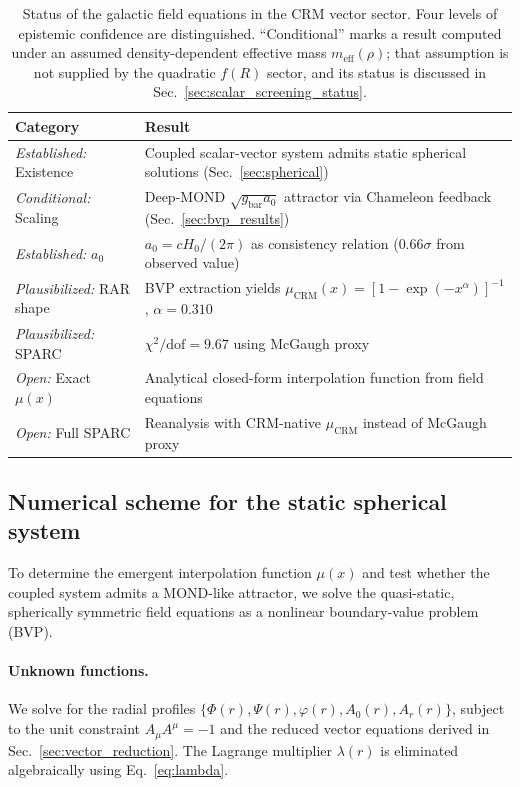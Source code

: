 \documentclass[aps,prd,twocolumn,superscriptaddress,nofootinbib]{revtex4-2}
\begin{document}
\begin{table}[tbp]
\caption{\label{tab:galactic_status}Status of the galactic field equations in the CRM vector sector. Four levels of epistemic confidence are distinguished. ``Conditional'' marks a result computed under an assumed density-dependent effective mass $m_{\mathrm{eff}}(\rho)$; that assumption is not supplied by the quadratic $f(R)$ sector, and its status is discussed in Sec.~\ref{sec:scalar_screening_status}.}
\begin{ruledtabular}
\begin{tabular}{ll}
\textbf{Category} & \textbf{Result} \\
\hline
\textit{Established:} Existence & Coupled scalar-vector system admits static spherical solutions (Sec.~\ref{sec:spherical}) \\
\textit{Conditional:} Scaling & Deep-MOND $\sqrt{g_{\mathrm{bar}} a_0}$ attractor via Chameleon feedback (Sec.~\ref{sec:bvp_results}) \\
\textit{Established:} $a_0$ & $a_0 = cH_0/(2\pi)$ as consistency relation ($0.66\sigma$ from observed value) \\
\hline
\textit{Plausibilized:} RAR shape & BVP extraction yields $\mu_{\mathrm{CRM}}(x) = [1-\exp(-x^\alpha)]^{-1}$, $\alpha = 0.310$ \\
\textit{Plausibilized:} SPARC & $\chi^2/\mathrm{dof} = 9.67$ using McGaugh proxy \\
\hline
\textit{Open:} Exact $\mu(x)$ & Analytical closed-form interpolation function from field equations \\
\textit{Open:} Full SPARC & Reanalysis with CRM-native $\mu_{\mathrm{CRM}}$ instead of McGaugh proxy \\
\end{tabular}
\end{ruledtabular}
\end{table}

\subsection{Numerical scheme for the static spherical system}
\label{sec:numerical_scheme}

To determine the emergent interpolation function $\mu(x)$ and test whether the coupled system admits a MOND-like attractor, we solve the quasi-static, spherically symmetric field equations as a nonlinear boundary-value problem (BVP).

\paragraph{Unknown functions.}
We solve for the radial profiles $\{\Phi(r), \Psi(r), \varphi(r), A_0(r), A_r(r)\}$, subject to the unit constraint $A_\mu A^\mu = -1$ and the reduced vector equations derived in Sec.~\ref{sec:vector_reduction}. The Lagrange multiplier $\lambda(r)$ is eliminated algebraically using Eq.~\eqref{eq:lambda}.
\end{document}
